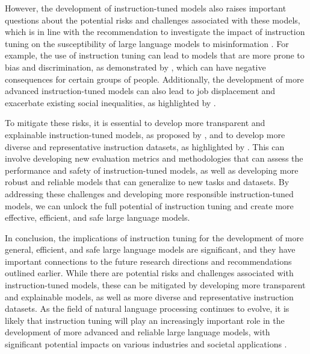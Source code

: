 \documentclass[11pt]{article}
\begin{document}
However, the development of instruction-tuned models also raises important questions about the potential risks and challenges associated with these models, which is in line with the recommendation to investigate the impact of instruction tuning on the susceptibility of large language models to misinformation \cite{ref96}. For example, the use of instruction tuning can lead to models that are more prone to bias and discrimination, as demonstrated by \cite{ref164}, which can have negative consequences for certain groups of people. Additionally, the development of more advanced instruction-tuned models can also lead to job displacement and exacerbate existing social inequalities, as highlighted by \cite{ref2}.

To mitigate these risks, it is essential to develop more transparent and explainable instruction-tuned models, as proposed by \cite{ref165}, and to develop more diverse and representative instruction datasets, as highlighted by \cite{ref166}. This can involve developing new evaluation metrics and methodologies that can assess the performance and safety of instruction-tuned models, as well as developing more robust and reliable models that can generalize to new tasks and datasets. By addressing these challenges and developing more responsible instruction-tuned models, we can unlock the full potential of instruction tuning and create more effective, efficient, and safe large language models.

In conclusion, the implications of instruction tuning for the development of more general, efficient, and safe large language models are significant, and they have important connections to the future research directions and recommendations outlined earlier. While there are potential risks and challenges associated with instruction-tuned models, these can be mitigated by developing more transparent and explainable models, as well as more diverse and representative instruction datasets. As the field of natural language processing continues to evolve, it is likely that instruction tuning will play an increasingly important role in the development of more advanced and reliable large language models, with significant potential impacts on various industries and societal applications \cite{ref32}.
\end{document}

